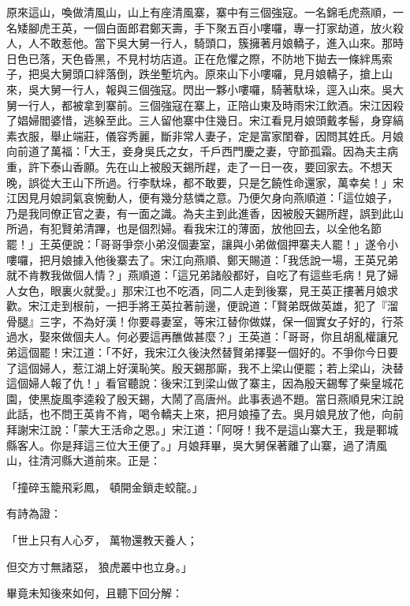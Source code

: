 原來這山，喚做清風山，山上有座清風寨，寨中有三個強寇。一名錦毛虎燕順，一名矮腳虎王英，一個白面郎君鄭天壽，手下聚五百小嘍囉，專一打家劫道，放火殺人，人不敢惹他。當下吳大舅一行人，騎頭口，簇擁著月娘轎子，進入山來。那時日色已落，天色昏黑，不見村坊店道。正在危懼之際，不防地下拋去一條絆馬索子，把吳大舅頭口絆落倒，跌坐塹坑內。原來山下小嘍囉，見月娘轎子，搶上山來，吳大舅一行人，報與三個強寇。閃出一夥小嘍囉，騎著馱垛，逕入山來。吳大舅一行人，都被拿到寨前。三個強寇在寨上，正陪山東及時雨宋江飲酒。宋江因殺了娼婦閻婆惜，逃躲至此。三人留他寨中住幾日。宋江看見月娘頭戴孝髻，身穿縞素衣服，舉止端莊，儀容秀麗，斷非常人妻子，定是富家閨眷，因問其姓氏。月娘向前道了萬福：「大王，妾身吳氏之女，千戶西門慶之妻，守節孤霜。因為夫主病重，許下泰山香願。先在山上被殷天錫所趕，走了一日一夜，要回家去。不想天晚，誤從大王山下所過。行李馱垛，都不敢要，只是乞饒性命還家，萬幸矣！」宋江因見月娘詞氣哀惋動人，便有幾分慈憐之意。乃便欠身向燕順道：「這位娘子，乃是我同僚正官之妻，有一面之識。為夫主到此進香，因被殷天錫所趕，誤到此山所過，有犯賢弟清蹕，也是個烈婦。看我宋江的薄面，放他回去，以全他名節罷！」王英便說：「哥哥爭奈小弟沒個妻室，讓與小弟做個押寨夫人罷！」遂令小嘍囉，把月娘據入他後寨去了。宋江向燕順、鄭天賜道：「我恁說一場，王英兄弟就不肯教我做個人情？」燕順道：「這兄弟諸般都好，自吃了有這些毛病！見了婦人女色，眼裏火就愛。」那宋江也不吃酒，同二人走到後寨，見王英正摟著月娘求歡。宋江走到根前，一把手將王英拉著前邊，便說道：「賢弟既做英雄，犯了『溜骨腿』三字，不為好漢！你要尋妻室，等宋江替你做媒，保一個實女子好的，行茶過水，娶來做個夫人。何必要這再醮做甚麼？」王英道：「哥哥，你且胡亂權讓兄弟這個罷！宋江道：「不好，我宋江久後決然替賢弟擇娶一個好的。不爭你今日要了這個婦人，惹江湖上好漢恥笑。殷天錫那廝，我不上梁山便罷；若上梁山，決替這個婦人報了仇！」看官聽說：後宋江到梁山做了寨主，因為殷天錫奪了柴皇城花園，使黑旋風李逵殺了殷天錫，大鬧了高唐州。此事表過不題。當日燕順見宋江說此話，也不問王英肯不肯，喝令轎夫上來，把月娘擡了去。吳月娘見放了他，向前拜謝宋江說：「蒙大王活命之恩。」宋江道：「阿呀！我不是這山寨大王，我是鄆城縣客人。你是拜這三位大王便了。」月娘拜畢，吳大舅保著離了山寨，過了清風山，往清河縣大道前來。正是：

「撞碎玉籠飛彩鳳，  頓開金鎖走蛟龍。」

有詩為證：

「世上只有人心歹，  萬物還教天養人；

但交方寸無諸惡，  狼虎叢中也立身。」

畢竟未知後來如何，且聽下回分解：

